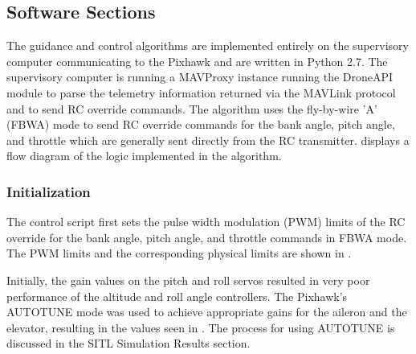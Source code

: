 \documentclass{aiaa}
\begin{document}
\subsection{Software Sections}

The guidance and control algorithms are implemented entirely on the supervisory computer communicating to the Pixhawk and are written in Python 2.7. The supervisory computer is running a MAVProxy instance running the DroneAPI module to parse the telemetry information returned via the MAVLink protocol and to send RC override commands. The algorithm uses the fly-by-wire 'A' (FBWA) mode to send RC override commands for the bank angle, pitch angle, and throttle which are generally sent directly from the RC transmitter.  displays a flow diagram of the logic implemented in the algorithm. 


\subsubsection{Initialization}

The control script first sets the pulse width modulation (PWM) limits of the RC override for the bank angle, pitch angle, and throttle commands in FBWA mode. The PWM limits and the corresponding physical limits are shown in .


Initially, the gain values on the pitch and roll servos resulted in very poor performance of the altitude and roll angle controllers. The Pixhawk's AUTOTUNE mode was used to achieve appropriate gains for the aileron and the elevator, resulting in the values seen in . The process for using AUTOTUNE is discussed in the SITL Simulation Results section.
\end{document}
